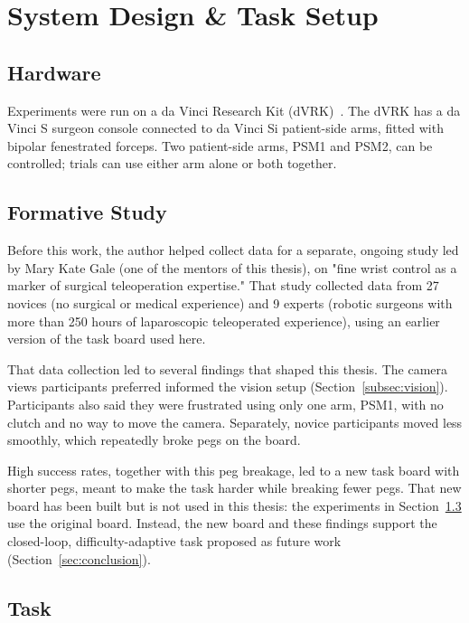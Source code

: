 ﻿\section{System Design \& Task Setup}
\label{sec:system_design}

\subsection{Hardware}

Experiments were run on a da Vinci Research Kit (dVRK)~\cite{dvrk}. The
dVRK has a da Vinci S surgeon console connected to da Vinci Si
patient-side arms, fitted with bipolar fenestrated forceps. Two
patient-side arms, PSM1 and PSM2, can be controlled; trials can use
either arm alone or both together.

\subsection{Formative Study}
\label{subsec:formative_study}

Before this work, the author helped collect data for a separate,
ongoing study led by Mary Kate Gale (one of the mentors of this
thesis), on "fine wrist control as a marker of surgical teleoperation
expertise." That study collected data from 27 novices (no surgical or
medical experience) and 9 experts (robotic surgeons with more than 250
hours of laparoscopic teleoperated experience), using an earlier
version of the task board used here.

That data collection led to several findings that shaped this thesis.
The camera views participants preferred informed the vision setup
(Section~\ref{subsec:vision}). Participants also said they were
frustrated using only one arm, PSM1, with no clutch and no way to move
the camera. Separately, novice participants moved less smoothly, which
repeatedly broke pegs on the board.

High success rates, together with this peg breakage, led to a new task
board with shorter pegs, meant to make the task harder while breaking
fewer pegs. That new board has been built but is not used in this
thesis: the experiments in Section~\ref{subsec:task} use the original
board. Instead, the new board and these findings support the
closed-loop, difficulty-adaptive task proposed as future work
(Section~\ref{sec:conclusion}).

\subsection{Task}
\label{subsec:task}

